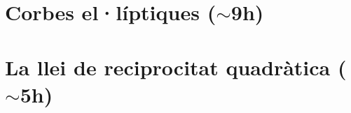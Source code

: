 \documentclass[11pt,fleqn]{book} %
\newcounter{let} \setcounter{let}{0}
\renewcommand{\1}{\mathbf{1}}
\newcommand{\0}{\mathbf{0}}
\begin{document}
\chapter{Corbes el·líptiques (\texorpdfstring{$\sim$9h}{})}
{
\let\subsection\section
\let\subsubsection\subsection
\let\paragraph\subsubsection

}
\chapter{La llei de reciprocitat quadràtica (\texorpdfstring{$\sim$5h}{})}
{
\let\subsection\section
\let\subsubsection\subsection
\let\paragraph\subsubsection

}
\end{document}
